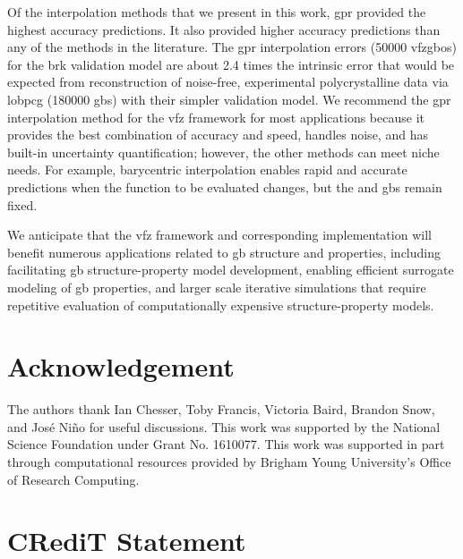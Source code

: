 \documentclass[final,twocolumn,12pt]{elsarticle}
\begin{document}
Of the interpolation methods that we present in this work, \Gls{gpr} provided the highest accuracy predictions. It also provided higher accuracy predictions than any of the methods in the literature. The \gls{gpr} interpolation errors (\num{50000} \glspl{vfzgbo}) for the \gls{brk} validation model are about \num{2.4} times the intrinsic error that would be expected from reconstruction of noise-free, experimental polycrystalline data via \gls{lobpcg} \cite{shenDeterminingGrainBoundary2019} (\num{180000} \glspl{gb}) with their simpler validation model. %
We recommend the \gls{gpr} interpolation method for the \gls{vfz} framework for most applications because it provides the best combination of accuracy and speed, handles \inpt{} noise, and has built-in uncertainty quantification; however, the other methods can meet niche needs. For example, barycentric interpolation enables rapid and accurate predictions when the function to be evaluated changes, but the \inpt{} and \outpt{} \glspl{gb} remain fixed.

We anticipate that the \gls{vfz} framework and corresponding implementation will benefit numerous applications related to \gls{gb} structure and properties, including facilitating \gls{gb} structure-property model development, enabling efficient surrogate modeling of \gls{gb} properties, and larger scale iterative simulations that require repetitive evaluation of computationally expensive structure-property models.

\section*{Acknowledgement}
\label{sec:acknowledgement}

The authors thank Ian Chesser, Toby Francis, Victoria Baird, Brandon Snow, and José Niño for useful discussions. This work was supported by the National Science Foundation under Grant No. 1610077. This work was supported in part through computational resources provided by Brigham Young University's Office of Research Computing.

\section*{CRediT Statement}

\end{document}
